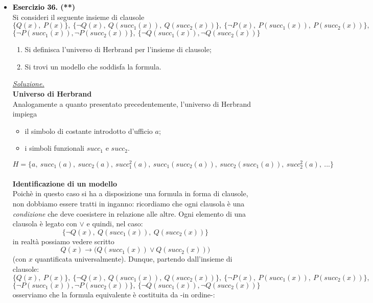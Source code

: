 \documentclass[a4paper,10pt]{article}
\makeatletter
\newcommand{\EsercitazioneNum}{13}
\newcommand{\Data}{11/12/2025}
\newcommand{\DocType}{Esercitazione} %
\newcommand{\FullTitle}{\DocType\ \EsercitazioneNum}
\newcommand{\Header}{
\noindent
  \small \textbf{Computabilità, Complessità e Logica - a.a. 2025/26} \hfill \textbf{\FullTitle} \\[0.2cm]
  \scriptsize Matteo Liotta, \texttt{matteo.liotta@studenti.units.it} \hfill \Data \\[0.2cm]
  \noindent\makebox[\linewidth]{\rule{\linewidth}{0.4pt}} \\[0.3cm]}
\newcommand{\NewPageHeader}{
  \vfill
  \noindent\makebox[\linewidth]{\rule{\linewidth}{0.4pt}}
  \newpage
  {\Header}
}
\makeatother
\begin{document}
{\begin{itemize}[label=, leftmargin=0pt]
    \NewPageHeader
    \item \textbf{\textcolor{black}{Esercizio 36.} (**)} \\ 	
    Si consideri il seguente insieme di clausole
    $$\{Q(x),\ P(x)\},\ 
    \{\lnot Q(x),\ Q(succ_1(x)),\ Q(succ_2(x))\},\
    \{\lnot P(x),\ P(succ_1(x)),\ P(succ_2(x))\},$$
    $$\{\lnot P(succ_1(x)),\lnot P(succ_2(x))\},\
    \{\lnot Q(succ_1(x)),\lnot Q(succ_2(x))\}
    $$
    
    \begin{enumerate}
        \item Si definisca l'universo di Herbrand per l'insieme di clausole;
        \item Si trovi un modello che soddisfa la formula.
    \end{enumerate}

    \begin{osservazioni}
    \underline{\textit{Soluzione.}}\\

    \textbf{Universo di Herbrand}\\
    Analogamente a quanto presentato precedentemente, l'universo di Herbrand impiega 
    \begin{itemize}
        \item il simbolo di costante introdotto d'ufficio $a$;
        \item i simboli funzionali $succ_1$ e $succ_2$.
    \end{itemize}
    $$H=\{a,\ succ_1(a),\ succ_2(a),\ succ_1^2(a),\ succ_1(succ_2(a)),\ succ_2(succ_1(a)),\ succ_2^2(a),\ ...\}$$\\
    \textbf{Identificazione di un modello}\\
    Poichè in questo caso si ha a disposizione una formula in forma di clausole, non dobbiamo essere tratti in inganno: ricordiamo che ogni clausola è una \textit{condizione} che deve coesistere in relazione alle altre. Ogni elemento di una clausola è legato con $\lor$ e quindi, nel caso:
    $$\{\lnot Q(x),\ Q(succ_1(x)),\ Q(succ_2(x))\}$$
    in realtà possiamo vedere scritto
    $$Q(x)\rightarrow \bigg( Q(succ_1(x)) \lor Q(succ_2(x))\bigg)$$
    (con $x$ quantificata universalmente). Dunque, partendo dall'insieme di clausole:
    $$\{Q(x),\ P(x)\},\ 
    \{\lnot Q(x),\ Q(succ_1(x)),\ Q(succ_2(x))\},\
    \{\lnot P(x),\ P(succ_1(x)),\ P(succ_2(x))\},$$
    $$\{\lnot P(succ_1(x)),\lnot P(succ_2(x))\},\
    \{\lnot Q(succ_1(x)),\lnot Q(succ_2(x))\}
    $$
    osserviamo che la formula equivalente è costituita da -in ordine-:
    

\end{osservazioni}
\end{itemize}}
\end{document}
